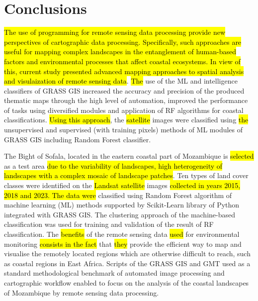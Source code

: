 \documentclass[coasts,article,submit,pdftex,moreauthors]{Definitions/mdpi}
\begin{document}
\section{Conclusions}

\hl{The use of programming for remote sensing data processing provide new perspectives of cartographic data processing. Specifically, such approaches are useful for mapping complex landscapes in the entanglement of human-based factors and environmental processes that affect coastal ecosystems. In view of this, current study presented advanced mapping approaches to spatial analysis and visulaization of remote sensing data}. \hl{The} use of the ML and intelligence classifiers of GRASS GIS increased the accuracy and precision of the produced thematic maps through the high level of automation, improved the performance of tasks using diversified modules and application of RF algorithms for coastal classifications. \hl{Using this approach}, the \hl{satellite }images were classified using \hl{the }unsupervised and supervised (with training pixels) methods of ML modules of GRASS GIS including Random Forest classifier. 

The Bight of Sofala, located in the eastern coastal part of Mozambique is \hl{selected} as a test area \hl{due to the variability of landscapes, high heterogeneity of landscapes with a complex mosaic of landscape patches}. Ten types of land cover classes were identified on the \hl{Landsat satellite }images \hl{collected in years 2015, 2018 and 2023. The data were }classified using Random Forest algorithm of machine learning (ML) methods supported by Scikit-Learn library of Python integrated with GRASS GIS. The clustering approach of the machine-based classification was used for training and validation of the result of RF classification. The \hl{benefits} of the\hl{ }remote sensing data\hl{ used }for environmental monitoring \hl{consists in the fact} that \hl{they} provide the efficient way to map and visualise the remotely located regions which are otherwise difficult to reach, such as coastal regions in East Africa. Scripts of the GRASS GIS and GMT used as a standard methodological benchmark of automated image processing and cartographic workflow enabled to focus on the analysis of the coastal landscapes of Mozambique by remote sensing data processing. 
\end{document}
